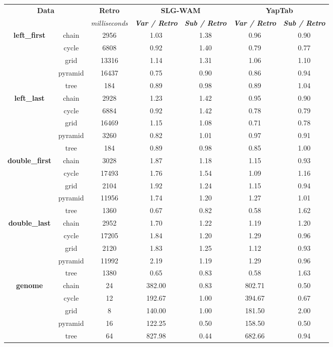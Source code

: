 \begin{table}[ht]
\centering
\footnotesize{
  \begin{tabular}{cc|c|cc|cc}
   \hline
    \hline
    \multicolumn{2}{c|}{\multirow{2}{*}{\small{\textbf{Data}}}} & \textbf{\small{Retro}} & \multicolumn{2}{c|}{\small{\textbf{SLG-WAM}}} & \multicolumn{2}{c}{\small{\textbf{YapTab}}} \\
     \multicolumn{2}{c|}{} & \scriptsize{\textit{milliseconds}} & \textbf{\textit{\scriptsize{Var / Retro}}} & \textbf{\textit{\scriptsize{Sub / Retro}}} & \textbf{\textit{\scriptsize{Var / Retro}}} & \textbf{\textit{\scriptsize{Sub / Retro}}} \\
   \hline
   \hline
   \multirow{5}{*}{\textbf{left\_first}} &  chain &  2956 &  1.03  &  1.38  &  0.96 & 0.90 \\
   &  cycle &  6808 &  0.92  &  1.40  &  0.79 & 0.77 \\
   &  grid &  13316 &  1.14  &  1.31  &  1.06 & 1.10 \\
   &  pyramid &  16437 &  0.75  &  0.90  &  0.86 & 0.94 \\
   &  tree &  184 &  0.89  &  0.98  &  0.89 & 1.04 \\
   \hline
   \multirow{5}{*}{\textbf{left\_last}} &  chain &  2928 &  1.23  &  1.42  &  0.95 & 0.90 \\
   &  cycle &  6884 &  0.92  &  1.42  &  0.78 & 0.79 \\
   &  grid &  16469 &  1.15  &  1.08  &  0.71 & 0.78 \\
   &  pyramid &  3260 &  0.82  &  1.01  &  0.97 & 0.91 \\
   &  tree &  184 &  0.89  &  0.98  &  0.85 & 1.00 \\
   \hline
\multirow{5}{*}{\textbf{double\_first}} &  chain &  3028 &  1.87  &  1.18  &  1.15 & 0.93 \\
&  cycle &  17493 &  1.76  &  1.54  &  1.09 & 1.16 \\
&  grid &  2104 &  1.92  &  1.24  &  1.15 & 0.94 \\
&  pyramid &  11956 &  1.74  &  1.20  &  1.27 & 1.01 \\
&  tree &  1360 &  0.67  &  0.82  &  0.58 & 1.62 \\
\hline
\multirow{5}{*}{\textbf{double\_last}} &  chain &  2952 &  1.70  &  1.22  &  1.19 & 1.20 \\
&  cycle &  17205 &  1.84  &  1.20  &  1.29 & 0.96 \\
&  grid &  2120 &  1.83  &  1.25  &  1.12 & 0.93 \\
&  pyramid &  11992 &  2.19  &  1.19  &  1.29 & 0.96 \\
&  tree &  1380 &  0.65  &  0.83  &  0.58 & 1.63 \\
\hline
\multirow{5}{*}{\textbf{genome}} &  chain &  24 &  382.00  &  0.83  &  802.71 & 0.50 \\
&  cycle &  12 &  192.67  &  1.00  &  394.67 & 0.67 \\
&  grid &  8 &  140.00  &  1.00  &  181.50 & 2.00 \\
&  pyramid &  16 &  122.25  &  0.50  &  158.50 & 0.50 \\
&  tree &  64 &  827.98  &  0.44  &  682.66 & 0.94 \\
\hline


\end{tabular}}
\end{table}
